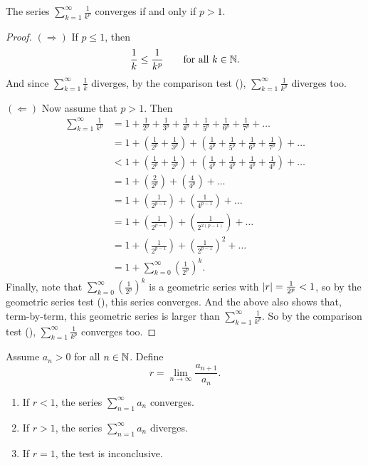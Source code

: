 \begin{proposition}
  The series $\sum_{k = 1}^{\infty} \frac{1}{k^p}$ converges if and
  only if $p > 1$.
\end{proposition}

\begin{proof}
  \phantom{.}

  $(\Rightarrow)$ If $p \leq 1$, then
  \[ \frac{1}{k} \leq \frac{1}{k^p} \qquad \text{for all $k \in \mathbb N$}. \]
  And since $\sum_{k = 1}^{\infty} \frac{1}{k}$ diverges, by the
  comparison test (), $\sum_{k = 1}^{\infty}
  \frac{1}{k^p}$ diverges too.

  $(\Leftarrow)$ Now assume that $p > 1$. Then
  \begin{align*}
    \sum_{k = 1}^{\infty} \frac{1}{k^p} & = 1 + \frac{1}{2^p} +
    \frac{1}{3^p} + \frac{1}{4^p} + \frac{1}{5^p} + \frac{1}{6^p} +
    \frac{1}{7^p} + \dots \\
    & = 1 + \left(\frac{1}{2^p} + \frac{1}{3^p}\right) +
    \left(\frac{1}{4^p} + \frac{1}{5^p} + \frac{1}{6^p} +
    \frac{1}{7^p}\right) + \dots \\
    & < 1 + \left(\frac{1}{2^p} + \frac{1}{2^p}\right) +
    \left(\frac{1}{4^p} + \frac{1}{4^p} + \frac{1}{4^p} +
    \frac{1}{4^p}\right) + \dots \\
    & = 1 + \left(\frac{2}{2^p}\right) + \left(\frac{4}{4^p}\right) + \dots \\
    & = 1 + \left(\frac{1}{2^{p - 1}}\right) + \left(\frac{1}{4^{p -
    1}}\right) + \dots \\
    & = 1 + \left(\frac{1}{2^{p - 1}}\right) + \left(\frac{1}{2^{2(p
    - 1)}}\right) + \dots \\
    & = 1 + \left(\frac{1}{2^{p - 1}}\right) + \left(\frac{1}{2^{p -
    1}}\right)^2 + \dots \\
    & = 1 + \sum_{k = 0}^{\infty} \left(\frac{1}{2^p}\right)^k.
  \end{align*}
  Finally, note that $\sum_{k = 0}^{\infty} (\frac{1}{2^p})^k$ is a
  geometric series with $| r | = \frac{1}{2^p} < 1$, so by the
  geometric series test (), this series
  converges. And the above also shows that, term-by-term, this
  geometric series is larger than $\sum_{k = 1}^{\infty}
  \frac{1}{k^p}$. So by the comparison test
  (), $\sum_{k = 1}^{\infty}
  \frac{1}{k^p}$ converges too.
\end{proof}

\begin{proposition}
  Assume $a_n > 0$ for all $n \in \mathbb N$. Define
  \[ r = \lim_{n \to \infty} \frac{a_{n + 1}}{a_n}. \]
  \begin{enumerate}
    \item If $r < 1$, the series $\sum_{n = 1}^{\infty} a_n$ converges.
    \item If $r > 1$, the series $\sum_{n = 1}^{\infty} a_n$ diverges.
    \item If $r = 1$, the test is inconclusive.
  \end{enumerate}
\end{proposition}

